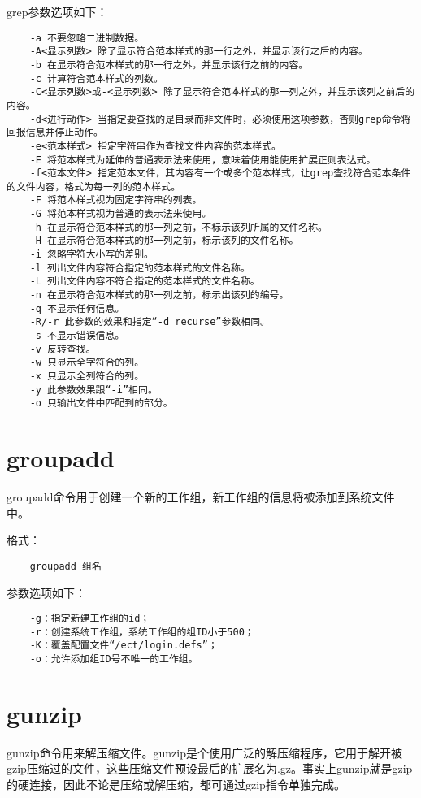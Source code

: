 \documentclass[a4paper,left=2.5cm,right=2.5cm,11pt]{article}
\begin{document}
	grep参数选项如下：
	\begin{lstlisting}
	-a 不要忽略二进制数据。 
	-A<显示列数> 除了显示符合范本样式的那一行之外，并显示该行之后的内容。 
	-b 在显示符合范本样式的那一行之外，并显示该行之前的内容。 
	-c 计算符合范本样式的列数。 
	-C<显示列数>或-<显示列数> 除了显示符合范本样式的那一列之外，并显示该列之前后的内容。 
	-d<进行动作> 当指定要查找的是目录而非文件时，必须使用这项参数，否则grep命令将回报信息并停止动作。 
	-e<范本样式> 指定字符串作为查找文件内容的范本样式。 
	-E 将范本样式为延伸的普通表示法来使用，意味着使用能使用扩展正则表达式。 
	-f<范本文件> 指定范本文件，其内容有一个或多个范本样式，让grep查找符合范本条件的文件内容，格式为每一列的范本样式。 
	-F 将范本样式视为固定字符串的列表。 
	-G 将范本样式视为普通的表示法来使用。 
	-h 在显示符合范本样式的那一列之前，不标示该列所属的文件名称。 
	-H 在显示符合范本样式的那一列之前，标示该列的文件名称。 
	-i 忽略字符大小写的差别。 
	-l 列出文件内容符合指定的范本样式的文件名称。 
	-L 列出文件内容不符合指定的范本样式的文件名称。 
	-n 在显示符合范本样式的那一列之前，标示出该列的编号。 
	-q 不显示任何信息。 
	-R/-r 此参数的效果和指定“-d recurse”参数相同。 
	-s 不显示错误信息。 
	-v 反转查找。 
	-w 只显示全字符合的列。 
	-x 只显示全列符合的列。 
	-y 此参数效果跟“-i”相同。 
	-o 只输出文件中匹配到的部分。
	\end{lstlisting}

\section{groupadd}
	groupadd命令用于创建一个新的工作组，新工作组的信息将被添加到系统文件中。\par

	格式：
	\begin{lstlisting}
	groupadd 组名
	\end{lstlisting}

	参数选项如下：
	\begin{lstlisting}
	-g：指定新建工作组的id； 
	-r：创建系统工作组，系统工作组的组ID小于500； 
	-K：覆盖配置文件“/ect/login.defs”； 
	-o：允许添加组ID号不唯一的工作组。
	\end{lstlisting}

\section{gunzip}
	gunzip命令用来解压缩文件。gunzip是个使用广泛的解压缩程序，它用于解开被gzip压缩过的文件，这些压缩文件预设最后的扩展名为.gz。事实上gunzip就是gzip的硬连接，因此不论是压缩或解压缩，都可通过gzip指令单独完成。\par
\end{document}
